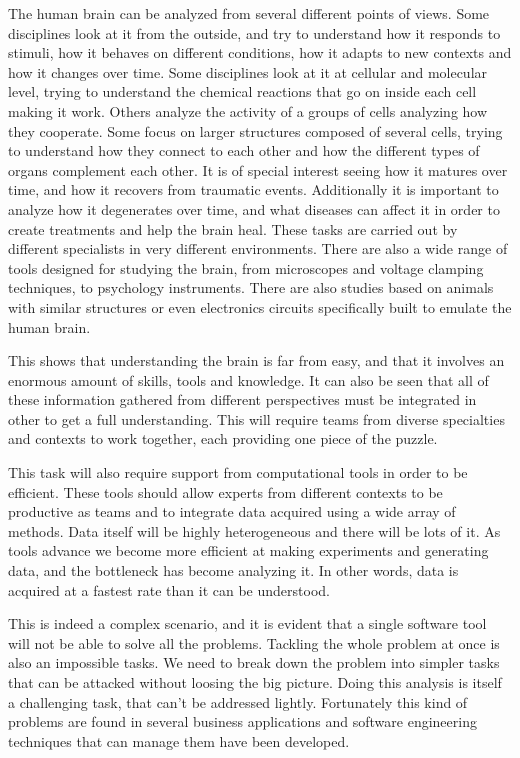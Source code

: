 
The human brain can be analyzed from several different points of views. Some disciplines look at it from the outside, and try to understand how it responds to stimuli, how it behaves on different conditions, how it adapts to new contexts and how it changes over time. Some disciplines look at it at cellular and molecular level, trying to understand the chemical reactions that go on inside each cell making it work. Others analyze the activity of a groups of cells analyzing how they cooperate. Some focus on larger structures composed of several cells, trying to understand how they connect to each other and how the different types of organs complement each other. It is of special interest seeing how it matures over time, and how it recovers from traumatic events. Additionally it is important to analyze how it degenerates over time, and what diseases can affect it in order to create treatments and help the brain heal. 
These tasks are carried out by different specialists in very different environments. There are also a wide range of tools designed for studying the brain, from microscopes and voltage clamping techniques, to psychology instruments. There are also studies based on animals with similar structures or even electronics circuits specifically built to emulate the human brain. 

This shows that understanding the brain is far from easy, and that it involves an enormous amount of skills, tools and knowledge. It can also be seen that all of these information gathered from different perspectives must be integrated in other to get a full understanding. This will require teams from diverse specialties and contexts to work together, each providing one piece of the puzzle. 

This task will also require support from computational tools in order to be efficient. These tools should allow experts from different contexts to be productive as teams and to integrate data acquired using a wide array of methods. Data itself will be highly heterogeneous and there will be lots of it. As tools advance we become more efficient at making experiments and generating data, and the bottleneck has become analyzing it. In other words, data is acquired at a fastest rate than it can be understood. 

This is indeed a complex scenario, and it is evident that a single software tool will not be able to solve all the problems. Tackling the whole problem at once is also an impossible tasks. We need to break down the problem into simpler tasks that can be attacked without loosing the big picture. Doing this analysis is itself a challenging task, that can't be addressed lightly. Fortunately this kind of problems are found in several business applications and  software engineering techniques that can manage them have been developed. 

